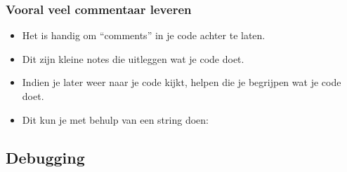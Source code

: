 \begin{frame}
\frametitle{Vooral veel commentaar leveren}

\begin{itemize}
  \item<1-> Het is handig om ``comments'' in je code achter te laten.
  \item<2-> Dit zijn kleine notes die uitleggen wat je code doet.
  \item<3-> Indien je later weer naar je code kijkt, helpen die je begrijpen wat je code doet.
  \item<4-> Dit kun je met behulp van een string doen: 
\end{itemize}




\end{frame}







\subsection{Debugging}


